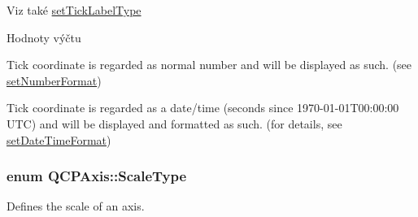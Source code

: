 \begin{DoxySeeAlso}{Viz také}
\hyperlink{classQCPAxis_a54f24f5ce8feea25209388a863d7e448}{set\+Tick\+Label\+Type} 
\end{DoxySeeAlso}
\begin{Desc}
\item[Hodnoty výčtu]\par
\begin{description}
\item[{\em 
\hypertarget{classQCPAxis_a4a7da0166f755f5abac23b765d184cada7f1eacf3b73adaefd334bea04e094b7e}{}lt\+Number\label{classQCPAxis_a4a7da0166f755f5abac23b765d184cada7f1eacf3b73adaefd334bea04e094b7e}
}]Tick coordinate is regarded as normal number and will be displayed as such. (see \hyperlink{classQCPAxis_ae585a54dc2aac662e90a2ca82f002590}{set\+Number\+Format}) \item[{\em 
\hypertarget{classQCPAxis_a4a7da0166f755f5abac23b765d184cadafc70594a9d877124dd11ccc187d4ac52}{}lt\+Date\+Time\label{classQCPAxis_a4a7da0166f755f5abac23b765d184cadafc70594a9d877124dd11ccc187d4ac52}
}]Tick coordinate is regarded as a date/time (seconds since 1970-\/01-\/01\+T00\+:00\+:00 U\+T\+C) and will be displayed and formatted as such. (for details, see \hyperlink{classQCPAxis_a2ee0191daa03524a682113e63e05f7a7}{set\+Date\+Time\+Format}) \end{description}
\end{Desc}
\hypertarget{classQCPAxis_a36d8e8658dbaa179bf2aeb973db2d6f0}{}
\subsubsection[{Scale\+Type}]{\setlength{\rightskip}{0pt plus 5cm}enum {\bf Q\+C\+P\+Axis\+::\+Scale\+Type}}\label{classQCPAxis_a36d8e8658dbaa179bf2aeb973db2d6f0}


Defines the scale of an axis. 

